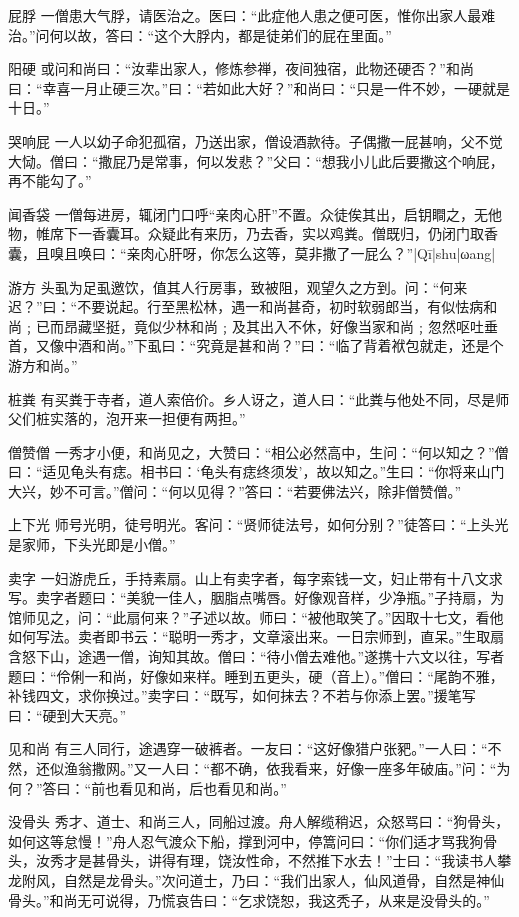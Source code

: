 \documentclass[12pt,UTF8]{ctexbook}
\begin{document}
屁脬
一僧患大气脬，请医治之。医曰：“此症他人患之便可医，惟你出家人最难治。”问何以故，答曰：“这个大脬内，都是徒弟们的屁在里面。”

阳硬
或问和尚曰：“汝辈出家人，修炼参禅，夜间独宿，此物还硬否？”和尚曰：“幸喜一月止硬三次。”曰：“若如此大好？”和尚曰：“只是一件不妙，一硬就是十日。”

哭响屁
一人以幼子命犯孤宿，乃送出家，僧设酒款待。子偶撒一屁甚响，父不觉大恸。僧曰：“撒屁乃是常事，何以发悲？”父曰：“想我小儿此后要撒这个响屁，再不能勾了。”

闻香袋
一僧每进房，辄闭门口呼“亲肉心肝”不置。众徒俟其出，启钥瞷之，无他物，帷席下一香囊耳。众疑此有来历，乃去香，实以鸡粪。僧既归，仍闭门取香囊，且嗅且唤曰：“亲肉心肝呀，你怎么这等，莫非撒了一屁么？”|Qī|shu|ωang|

游方
头虱为足虱邀饮，值其人行房事，致被阻，观望久之方到。问：“何来迟？”曰：“不要说起。行至黑松林，遇一和尚甚奇，初时软弱郎当，有似怯病和尚﹔已而昂藏坚挺，竟似少林和尚﹔及其出入不休，好像当家和尚﹔忽然呕吐垂首，又像中酒和尚。”下虱曰：“究竟是甚和尚？”曰：“临了背着袱包就走，还是个游方和尚。”

桩粪
有买粪于寺者，道人索倍价。乡人讶之，道人曰：“此粪与他处不同，尽是师父们桩实落的，泡开来一担便有两担。”

僧赞僧
一秀才小便，和尚见之，大赞曰：“相公必然高中，生问：“何以知之？”僧曰：“适见龟头有痣。相书曰：‘龟头有痣终须发’，故以知之。”生曰：“你将来山门大兴，妙不可言。”僧问：“何以见得？”答曰：“若要佛法兴，除非僧赞僧。”

上下光
师号光明，徒号明光。客问：“贤师徒法号，如何分别？”徒答曰：“上头光是家师，下头光即是小僧。”

卖字
一妇游虎丘，手持素扇。山上有卖字者，每字索钱一文，妇止带有十八文求写。卖字者题曰：“美貌一佳人，胭脂点嘴唇。好像观音样，少净瓶。”子持扇，为馆师见之，问：“此扇何来？”子述以故。师曰：“被他取笑了。”因取十七文，看他如何写法。卖者即书云：“聪明一秀才，文章滚出来。一日宗师到，直呆。”生取扇含怒下山，途遇一僧，询知其故。僧曰：“待小僧去难他。”遂携十六文以往，写者题曰：“伶俐一和尚，好像如来样。睡到五更头，硬（音上）。”僧曰：“尾韵不雅，补钱四文，求你换过。”卖字曰：“既写，如何抹去？不若与你添上罢。”援笔写曰：“硬到大天亮。”

见和尚
有三人同行，途遇穿一破裤者。一友曰：“这好像猎户张豝。”一人曰：“不然，还似渔翁撒网。”又一人曰：“都不确，依我看来，好像一座多年破庙。”问：“为何？”答曰：“前也看见和尚，后也看见和尚。”

没骨头
秀才、道士、和尚三人，同船过渡。舟人解缆稍迟，众怒骂曰：“狗骨头，如何这等怠慢！”舟人忍气渡众下船，撑到河中，停篙问曰：“你们适才骂我狗骨头，汝秀才是甚骨头，讲得有理，饶汝性命，不然推下水去！”士曰：“我读书人攀龙附风，自然是龙骨头。”次问道士，乃曰：“我们出家人，仙风道骨，自然是神仙骨头。”和尚无可说得，乃慌哀告曰：“乞求饶恕，我这秃子，从来是没骨头的。”
\end{document}
